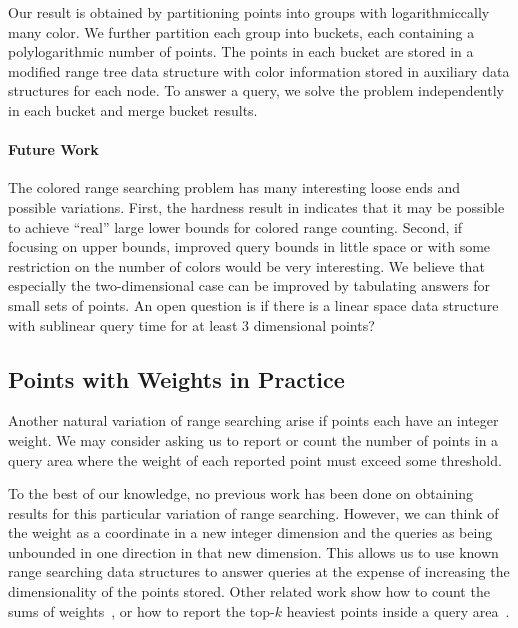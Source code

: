 Our result is obtained by partitioning points into groups with logarithmiccally many color. %
We further partition each group into buckets, each containing a polylogarithmic number of points. 
The points in each bucket are stored in a modified range tree data structure with color information stored in auxiliary data structures for each node.
To answer a query, we solve the problem independently in each bucket and merge bucket results. 


\paragraph{Future Work}
The colored range searching problem has many interesting loose ends and possible variations. First, the hardness result in \cite{kaplan2007counting} indicates that it may be possible to achieve ``real'' large lower bounds for colored range counting. 
Second, if focusing on upper bounds, improved query bounds in little space or with some restriction on the number of colors would be very interesting. We believe that especially the two-dimensional case can be improved by tabulating answers for small sets of points. 
An open question is if there is a linear space data structure with sublinear query time for at least 3 dimensional points? 


\subsection{Points with Weights in Practice}
Another natural variation of range searching arise if points each have an integer weight. We may consider  asking us to report or count the number of points in a query area where the weight of each reported point must exceed some threshold. 

To the best of our knowledge, no previous work has been done on obtaining results for this particular variation of range searching. 
However, we can think of the weight as a coordinate in a new integer dimension and the queries as being unbounded in one direction in that new dimension. This allows us to use known range searching data structures to answer queries at the expense of increasing the dimensionality of the points stored.
Other related work show how to count the sums of weights~\cite{chazelle1990lower}, or how to report the top-$k$ heaviest points inside a query area~\cite{rahul2011efficient}.

